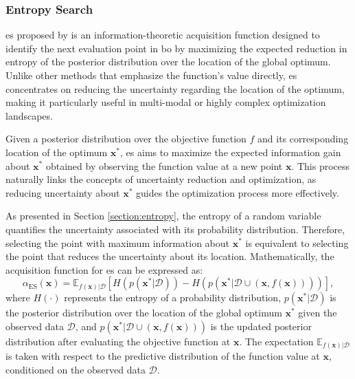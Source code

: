 \subsubsection{Entropy Search}
\label{section:entropy_search}

\acf{es} proposed by \citet{hennig2012entropy} is an information-theoretic acquisition function designed to identify the next evaluation point in \ac{bo} by maximizing the expected reduction in entropy of the posterior distribution over the location of the global optimum. Unlike other methods that emphasize the function's value directly, \ac{es} concentrates on reducing the uncertainty regarding the location of the optimum, making it particularly useful in multi-modal or highly complex optimization landscapes.

Given a posterior distribution over the objective function $f$ and its corresponding location of the optimum $\mathbf{x}^*$, \ac{es} aims to maximize the expected information gain about $\mathbf{x}^*$ obtained by observing the function value at a new point $\mathbf{x}$. This process naturally links the concepts of uncertainty reduction and optimization, as reducing uncertainty about $\mathbf{x}^*$ guides the optimization process more effectively.

As presented in Section \ref{section:entropy}, the entropy of a random variable quantifies the uncertainty associated with its probability distribution. Therefore, selecting the point with maximum information about $\mathbf{x}^*$ is equivalent to selecting the point that reduces the uncertainty about its location. Mathematically, the acquisition function for \ac{es} can be expressed as:
\begin{equation}
    \alpha_{\text{ES}}(\mathbf{x}) = \mathbb{E}_{f(\mathbf{x})|\mathcal{D}} \left[H(p(\mathbf{x}^*|\mathcal{D})) - H(p(\mathbf{x}^*|\mathcal{D} \cup (\mathbf{x}, f(\mathbf{x}))))\right],
\end{equation}
where $H(\cdot)$ represents the entropy of a probability distribution, $p(\mathbf{x}^*|\mathcal{D})$ is the posterior distribution over the location of the global optimum $\mathbf{x}^*$ given the observed data $\mathcal{D}$, and $p(\mathbf{x}^*|\mathcal{D} \cup (\mathbf{x}, f(\mathbf{x})))$ is the updated posterior distribution after evaluating the objective function at $\mathbf{x}$. The expectation $\mathbb{E}_{f(\mathbf{x})|\mathcal{D}}$ is taken with respect to the predictive distribution of the function value at $\mathbf{x}$, conditioned on the observed data $\mathcal{D}$.

